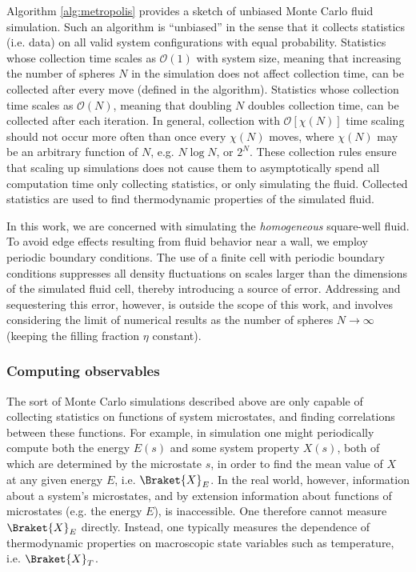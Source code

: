 \documentclass[11pt]{article}
\newcommand{\bk}{\Braket} %
\newcommand{\p}[1]{\left(#1\right)} %
\renewcommand{\sp}[1]{\left[#1\right]} %
\begin{document}
Algorithm \ref{alg:metropolis} provides a sketch of unbiased Monte
Carlo fluid simulation. Such an algorithm is ``unbiased'' in the sense
that it collects statistics (i.e. data) on all valid system
configurations with equal probability. Statistics whose collection
time scales as $\mathcal O\p{1}$ with system size, meaning that
increasing the number of spheres $N$ in the simulation does not affect
collection time, can be collected after every move (defined in the
algorithm). Statistics whose collection time scales as $\mathcal
O\p{N}$, meaning that doubling $N$ doubles collection time, can be
collected after each iteration. In general, collection with $\mathcal
O\sp{\chi\p{N}}$ time scaling should not occur more often than once
every $\chi\p{N}$ moves, where $\chi\p{N}$ may be an arbitrary
function of $N$, e.g. $N\log N$, or $2^N$. These collection rules
ensure that scaling up simulations does not cause them to
asymptotically spend all computation time only collecting statistics,
or only simulating the fluid. Collected statistics are used to find
thermodynamic properties of the simulated fluid.

In this work, we are concerned with simulating the \emph{homogeneous}
square-well fluid. To avoid edge effects resulting from fluid behavior
near a wall, we employ periodic boundary conditions. The use of a
finite cell with periodic boundary conditions suppresses all density
fluctuations on scales larger than the dimensions of the simulated
fluid cell, thereby introducing a source of error. Addressing and
sequestering this error, however, is outside the scope of this work,
and involves considering the limit of numerical results as the number
of spheres $N\to\infty$ (keeping the filling fraction $\eta$
constant).

\subsubsection{Computing observables}
\label{sec:computing_observables}

The sort of Monte Carlo simulations described above are only capable
of collecting statistics on functions of system microstates, and
finding correlations between these functions. For example, in
simulation one might periodically compute both the energy $E\p{s}$ and
some system property $X\p{s}$, both of which are determined by the
microstate $s$, in order to find the mean value of $X$ at any given
energy $E$, i.e. $\bk{X}_E$. In the real world, however, information
about a system's microstates, and by extension information about
functions of microstates (e.g. the energy $E$), is inaccessible. One
therefore cannot measure $\bk{X}_E$ directly. Instead, one typically
measures the dependence of thermodynamic properties on macroscopic
state variables such as temperature, i.e. $\bk{X}_T$.
\end{document}
